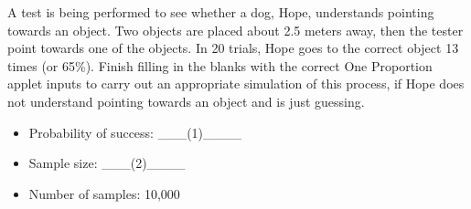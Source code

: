 \documentclass[10pt]{examdesign}
\begin{document}
\begin{multiplechoice}
		\begin{question}
			A test is being performed to see whether a dog, Hope, understands pointing towards an object. Two objects are placed about 2.5 meters away, then the tester point towards one of the objects. In 20 trials, Hope goes to the correct object 13 times (or 65\%).
			Finish filling in the blanks with the correct One Proportion applet inputs to carry out an appropriate simulation of this process, if Hope does not understand pointing towards an object and is just guessing.
			\begin{itemize}
				\item Probability of success: \_\_\_(1)\_\_\_\_
				\item Sample size: \_\_\_(2)\_\_\_\_
				\item Number of samples: 10,000
			\end{itemize}
		\end{question}
	
	\end{multiplechoice}
	
\end{document}
